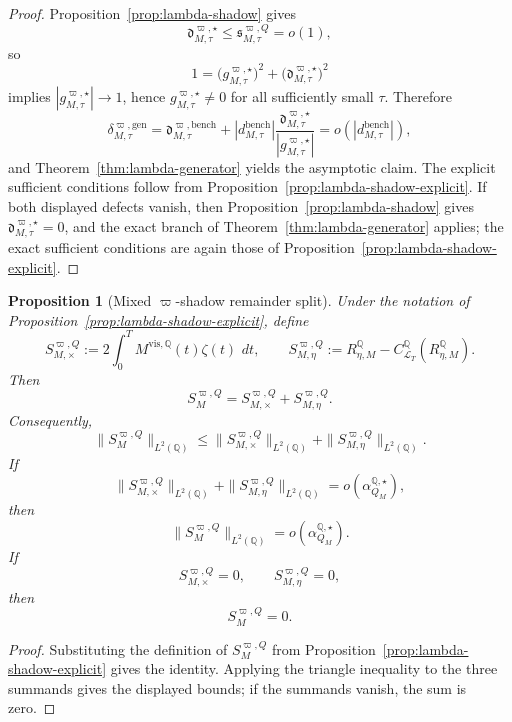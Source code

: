 \documentclass[11pt,a4paper]{amsart}
\theoremstyle{plain}
\newtheorem{proposition}[theorem]{Proposition}
\theoremstyle{definition}
\theoremstyle{remark}
\newcommand{\QQ}{\mathbb{Q}}
\newcommand{\cL}{\mathcal{L}}
\newcommand{\dd}{\,d}
\begin{document}
\begin{proof}
Proposition~\ref{prop:lambda-shadow} gives
\[
        \mathfrak d_{M,\tau}^{\varpi,\star}
        \le
        \mathfrak s_{M,\tau}^{\varpi,Q}
        =
        o(1),
\]
so
\[
        1
        =
        \bigl(g_{M,\tau}^{\varpi,\star}\bigr)^2
        +
        \bigl(\mathfrak d_{M,\tau}^{\varpi,\star}\bigr)^2
\]
implies \(|g_{M,\tau}^{\varpi,\star}|\to1\), hence \(g_{M,\tau}^{\varpi,\star}\neq0\) for all
sufficiently small \(\tau\).  Therefore
\[
        \delta_{M,\tau}^{\varpi,\mathrm{gen}}
        =
        \mathfrak d_{M,\tau}^{\varpi,\mathrm{bench}}
        +
        |d_{M,\tau}^{\mathrm{bench}}|
        \frac{\mathfrak d_{M,\tau}^{\varpi,\star}}{|g_{M,\tau}^{\varpi,\star}|}
        =
        o\!\left(|d_{M,\tau}^{\mathrm{bench}}|\right),
\]
and Theorem~\ref{thm:lambda-generator} yields the asymptotic claim.  The explicit sufficient
conditions follow from Proposition~\ref{prop:lambda-shadow-explicit}.  If both displayed defects
vanish, then Proposition~\ref{prop:lambda-shadow} gives
\(\mathfrak d_{M,\tau}^{\varpi,\star}=0\), and the exact branch of
Theorem~\ref{thm:lambda-generator} applies; the exact sufficient conditions are again those of
Proposition~\ref{prop:lambda-shadow-explicit}.
\end{proof}

\begin{proposition}[Mixed \(\varpi\)-shadow remainder split]\label{prop:lambda-shadow-mixed}
Under the notation of Proposition~\ref{prop:lambda-shadow-explicit}, define
\[
        S_{M,\times}^{\varpi,Q}
        :=
        2\int_0^T M^{\mathrm{vis},\QQ}(t)\zeta(t)\,\dd t,
        \qquad
        S_{M,\eta}^{\varpi,Q}
        :=
        R_{\eta,M}^\QQ-C_{\cL_T}^\QQ(R_{\eta,M}^\QQ).
\]
Then
\[
        S_{M}^{\varpi,Q}
        =
        S_{M,\times}^{\varpi,Q}
        +
        S_{M,\eta}^{\varpi,Q}.
\]
Consequently,
\[
        \|S_{M}^{\varpi,Q}\|_{L^2(\QQ)}
        \le
        \|S_{M,\times}^{\varpi,Q}\|_{L^2(\QQ)}
        +
        \|S_{M,\eta}^{\varpi,Q}\|_{L^2(\QQ)}.
\]
If
\[
        \|S_{M,\times}^{\varpi,Q}\|_{L^2(\QQ)}
        +
        \|S_{M,\eta}^{\varpi,Q}\|_{L^2(\QQ)}
        =
        o\!\left(\alpha_{Q_M}^{\QQ,\star}\right),
\]
then
\[
        \|S_{M}^{\varpi,Q}\|_{L^2(\QQ)}
        =
        o\!\left(\alpha_{Q_M}^{\QQ,\star}\right).
\]
If
\[
        S_{M,\times}^{\varpi,Q}=0,
        \qquad
        S_{M,\eta}^{\varpi,Q}=0,
\]
then
\[
        S_{M}^{\varpi,Q}=0.
\]
\end{proposition}

\begin{proof}
Substituting the definition of \(S_{M}^{\varpi,Q}\) from
Proposition~\ref{prop:lambda-shadow-explicit} gives the identity.  Applying the triangle inequality
to the three summands gives the displayed bounds; if the summands vanish, the sum is zero.
\end{proof}
\end{document}
